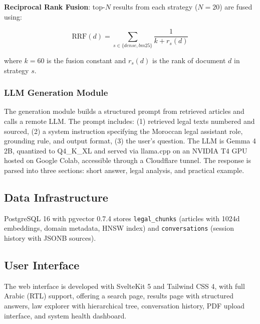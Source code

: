 \textbf{Reciprocal Rank Fusion}: top-$N$ results from each strategy
($N=20$) are fused using:

\[
\text{RRF}(d) = \sum_{s \in \{dense, bm25\}} \frac{1}{k + r_s(d)}
\]

where $k = 60$ is the fusion constant and $r_s(d)$ is the rank of
document $d$ in strategy $s$.

\subsubsection{LLM Generation Module}

The generation module builds a structured prompt from retrieved articles
and calls a remote LLM. The prompt includes: (1) retrieved legal texts
numbered and sourced, (2) a system instruction specifying the Moroccan
legal assistant role, grounding rule, and output format, (3) the user's
question. The LLM is Gemma 4 2B, quantized to Q4\_K\_XL and served via
llama.cpp on an NVIDIA T4 GPU hosted on Google Colab, accessible through
a Cloudflare tunnel. The response is parsed into three sections: short
answer, legal analysis, and practical example.

\subsection{Data Infrastructure}

PostgreSQL 16 with pgvector 0.7.4 stores \texttt{legal\_chunks} (articles
with 1024d embeddings, domain metadata, HNSW index) and
\texttt{conversations} (session history with JSONB sources).

\subsection{User Interface}

The web interface is developed with SvelteKit 5 and Tailwind CSS 4, with
full Arabic (RTL) support, offering a search page, results page with
structured answers, law explorer with hierarchical tree, conversation
history, PDF upload interface, and system health dashboard.
